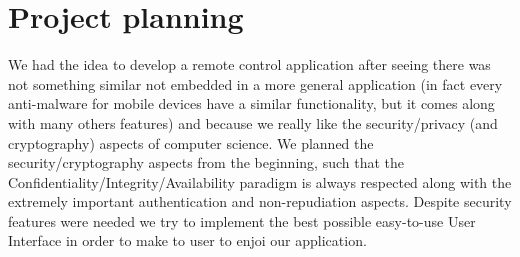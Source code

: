 \noindent
\Huge{\section{Project planning}} 
\small{We had the idea to develop a remote control application after seeing there was not something similar not embedded in a more general application (in fact every anti-malware for mobile devices have a similar functionality, but it comes along with many others features) and because we really like the security/privacy (and cryptography) aspects of computer science. We planned the security/cryptography aspects from the beginning, such that the Confidentiality/Integrity/Availability paradigm is always respected along with the extremely important authentication and non-repudiation aspects. Despite security features were needed we try to implement the best possible easy-to-use User Interface in order to make to user to enjoi our application.}